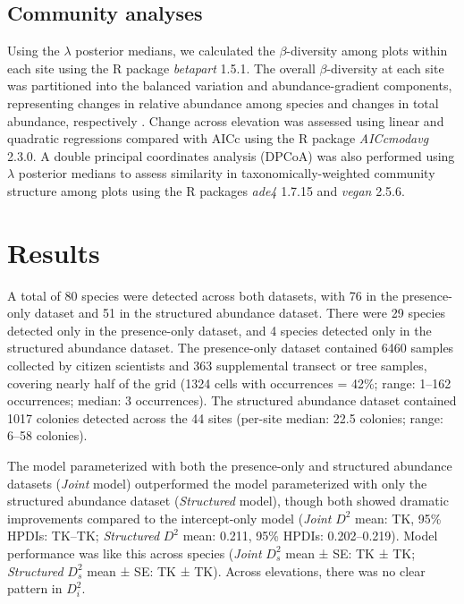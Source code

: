 \documentclass[preprint,review,times,12pt]{elsarticle}
\begin{document}
\subsection{Community analyses}
Using the $\lambda$ posterior medians, we calculated the $\beta$-diversity among plots within each site using the R package \emph{betapart} 1.5.1. The overall $\beta$-diversity at each site was partitioned into the balanced variation and abundance-gradient components, representing changes in relative abundance among species and changes in total abundance, respectively \citep{Baselga2017}. Change across elevation was assessed using linear and quadratic regressions compared with AICc using the R package \emph{AICcmodavg} 2.3.0. A double principal coordinates analysis (DPCoA) was also performed using $\lambda$ posterior medians to assess similarity in taxonomically-weighted community structure among plots \citep{Dray2015,Pavoine2019} using the R packages \emph{ade4} 1.7.15 and \emph{vegan} 2.5.6. 




\section{Results}
\label{S:3}
A total of 80 species were detected across both datasets, with 76 in the presence-only dataset and 51 in the structured abundance dataset. There were 29 species detected only in the presence-only dataset, and 4 species detected only in the structured abundance dataset. The presence-only dataset contained 6460 samples collected by citizen scientists and 363 supplemental transect or tree samples, covering nearly half of the grid (1324 cells with occurrences = 42\%; range: 1–162 occurrences; median: 3 occurrences). The structured abundance dataset contained 1017 colonies detected across the 44 sites (per-site median: 22.5 colonies; range: 6–58 colonies). 

The model parameterized with both the presence-only and structured abundance datasets (\emph{Joint} model) outperformed the model parameterized with only the structured abundance dataset (\emph{Structured} model), though both showed dramatic improvements compared to the intercept-only model (\emph{Joint} $D^2$ mean: TK, 95\% HPDIs: TK–TK; \emph{Structured} $D^2$ mean: 0.211, 95\% HPDIs: 0.202–0.219). Model performance was like this across species (\emph{Joint} $D^2_s$ mean ± SE: TK ± TK; \emph{Structured} $D^2_s$ mean ± SE: TK ± TK). Across elevations, there was no clear pattern in $D^2_i$.
\end{document}
